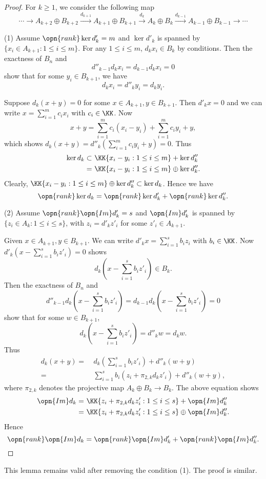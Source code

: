 \begin{proof}
    For $k\ge 1$, we consider the following map
    $$\cdots\to A_{k+2}\oplus B_{k+2}\xrightarrow{d_{k+1}}
    A_{k+1}\oplus B_{k+1}\xrightarrow{d_k} 
    A_k\oplus B_k\xrightarrow{d_{k-1}} 
    A_{k-1}\oplus B_{k-1}\to\cdots$$

(1) Assume $\opn{rank} \ker d'_k=m$ and $\ker d'_k$ is spanned by 
$\{x_i\in A_{k+1}:1\le i\le m\}$.
For any $1\le i\le m$, $d_k x_i\in B_k$ by conditions.
Then the exactness
of $B_n$ and
$$d''_{k-1}d_k x_i=d_{k-1}d_k x_i=0$$
show that for some $y_i\in B_{k+1}$, we have
$$d_kx_i=d''_ky_i=d_ky_i.$$

Suppose $d_k(x+y)=0$ for some $x\in A_{k+1}, y\in B_{k+1}$. 
Then $d'_kx=0$ and
we can write $x=\sum_{i=1}^m c_i x_i$ with $c_i\in \KK$. Now
$$x+y=\sum_{i=1}^m c_i (x_i-y_i)+\sum_{i=1}^m c_i y_i+y,$$
which shows $d_k(x+y)=d''_k(\sum_{i=1}^m c_i y_i+y)=0$. Thus
\begin{equation*}
    \begin{split}
        \ker d_k\subset &\  \KK\{x_i-y_i:1\le i\le m\}+\ker d''_k\\
        = &\  \KK\{x_i-y_i:1\le i\le m\}\oplus\ker d''_k.
    \end{split}
\end{equation*}
Clearly, $\KK\{x_i-y_i:1\le i\le m\}\oplus\ker d''_k\subset \ker d_k$.
Hence we have
$$\opn{rank} \ker d_k=\opn{rank} \ker d'_k+\opn{rank} \ker d''_k.$$

(2) Assume $\opn{rank} \opn{Im} d'_k=s$ and $\opn{Im} d'_k$ is spanned by 
$\{z_i\in A_{k}:1\le i\le s\}$, with $z_i=d'_kz'_i$ for some $z'_i\in 
A_{k+1}$.

Given $x\in A_{k+1}, y\in B_{k+1}$. We can write $d'_kx=\sum_{i=1}^s 
b_iz_i$ with $b_i\in \KK$.
Now $d'_k(x-\sum_{i=1}^s b_iz'_i)=0$ shows 
$$d_k(x-\sum_{i=1}^s b_iz'_i)\in B_k.$$
Then the exactness
of $B_n$ and
$$d''_{k-1}d_k(x-\sum_{i=1}^s b_iz'_i)
=d_{k-1}d_k(x-\sum_{i=1}^s b_iz'_i)=0$$
show that for some $w\in B_{k+1}$,
$$d_k(x-\sum_{i=1}^s b_iz'_i)=d''_kw=d_kw.$$
Thus
\begin{equation*}
    \begin{split}
        d_k(x+y)= & \ d_k(\sum_{i=1}^s b_iz'_i)+d''_k(w+y)\\
        = & \ \sum_{i=1}^s b_i(z_i+\pi_{2,k}d_kz'_i)+d''_k(w+y),
    \end{split}
\end{equation*}
where $\pi_{2,k}$ denotes the projective map $A_k\oplus B_k\to B_k$.
The above equation shows
\begin{equation*}
    \begin{split}
        \opn{Im} d_k = & \ \KK\{z_i+\pi_{2,k}d_kz'_i:1\le i\le s\}+
        \opn{Im} d''_k\\
        = & \ \KK\{z_i+\pi_{2,k}d_kz'_i:1\le i\le s\}\oplus
        \opn{Im} d''_k.
    \end{split}
\end{equation*}
Hence
$$\opn{rank} \opn{Im} d_k=\opn{rank} \opn{Im} d'_k+
\opn{rank} \opn{Im} d''_k.$$
\end{proof}
\begin{rem}
    This lemma remains valid after removing the condition (1). The proof
    is similar.
\end{rem}


